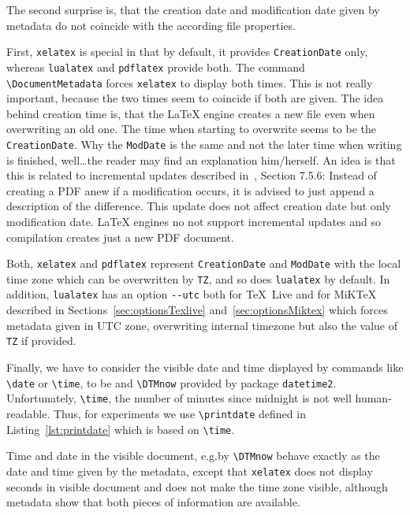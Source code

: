 \documentclass[a4paper, english]{article}%
\newcommand{\pdflatex}{\texttt{pdflatex}}
\newcommand{\lualatex}{\texttt{lualatex}}
\newcommand{\xelatex}{\texttt{xelatex}}
\newcommand{\cmd}[1]{\texttt{\textbackslash#1}}
\newcommand{\texlive}{\TeX~Live}
\newcommand{\miktex}{MiKTeX}
\begin{document}
The second surprise is, that the creation date and modification date given by metadata 
do not coincide with the according file properties. 

First, \xelatex{} is special in that by default, it provides \texttt{CreationDate} only, 
whereas \lualatex{} and \pdflatex{} provide both. 
The command \cmd{DocumentMetadata} forces \xelatex{} to display both times. 
This is not really important, because the two times seem to coincide if both are given. 
The idea behind creation time is, that the \LaTeX{} engine creates a new file 
even when overwriting an old one. 
The time when starting to overwrite seems to be the \texttt{CreationDate}. 
Why the \texttt{ModDate} is the same and not the later time when writing is finished, 
well\dots the reader may find an explanation him/herself. 
An idea is that this is related to incremental updates described in~\cite{Pdf20}, Section 7.5.6: 
Instead of creating a PDF anew if a modification occurs, 
it is advised to just append a description of the difference. 
This update does not affect creation date but only modification date. 
\LaTeX{} engines no not support incremental updates 
and so compilation creates just a new PDF document. 

Both, \xelatex{} and \pdflatex{} represent \texttt{CreationDate} and \texttt{ModDate} 
with the local time zone which can be overwritten by \texttt{TZ}, and so does \lualatex{} by default. 
In addition, \lualatex{} has an option \texttt{-{}-utc} 
both for \texlive{} and for \miktex{} 
described in Sections~\ref{sec:optionsTexlive} and~\ref{sec:optionsMiktex} 
which forces metadata given in UTC zone, 
overwriting internal timezone but also the value of \texttt{TZ} if provided. 
\medskip


Finally, we have to consider the visible date and time 
displayed by commands like \cmd{date} or \cmd{time}, to be 
and \cmd{DTMnow} provided by package \texttt{datetime2}. 
Unfortunately, \cmd{time}, the number of minutes since midnight is not well human-readable. 
Thus, for experiments we use \cmd{printdate} defined in Listing~\ref{lst:printdate} 
which is based on \cmd{time}. 








Time and date in the visible document, e.g.\@ by \cmd{DTMnow} 
behave exactly as the date and time given by the metadata, 
except that \xelatex{} does not display seconds in visible document 
and does not make the time zone visible, 
although metadata show that both pieces of information are available. 
\end{document}
